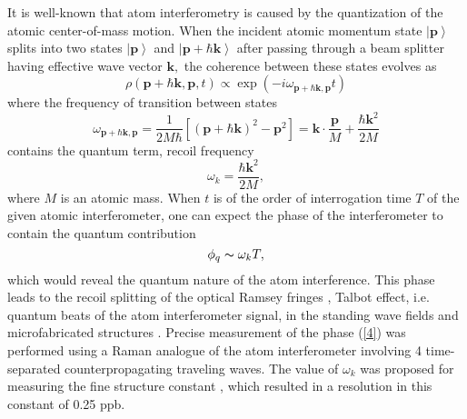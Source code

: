 \documentclass[twocolumn,showpacs,preprintnumbers]{revtex4}
\begin{document}
It is well-known that atom interferometry \cite{c1} is caused by the
quantization of the atomic center-of-mass motion. When the incident atomic
momentum state $\left\vert \mathbf{p}\right\rangle $ splits into two states $%
\left\vert \mathbf{p}\right\rangle $ and $\left\vert \mathbf{p}+\hbar 
\mathbf{k}\right\rangle $ after passing through a beam splitter having
effective wave vector $\mathbf{k},$ the coherence between these states
evolves as 
\begin{equation}
\rho \left( \mathbf{p}+\hbar \mathbf{k},\mathbf{p},t\right) \propto \exp
\left( -i\omega _{\mathbf{p}+\hbar \mathbf{k},\mathbf{p}}t\right)  \label{1}
\end{equation}%
where the frequency of transition between states%
\begin{equation}
\omega _{\mathbf{p}+\hbar \mathbf{k},\mathbf{p}}=\dfrac{1}{2M\hbar }\left[
\left( \mathbf{p}+\hbar \mathbf{k}\right) ^{2}-\mathbf{p}^{2}\right] =%
\mathbf{k}\cdot \dfrac{\mathbf{p}}{M}+\dfrac{\hbar \mathbf{k}^{2}}{2M}
\label{2}
\end{equation}%
contains the quantum term, recoil frequency%
\begin{equation}
\omega _{k}=\dfrac{\hbar \mathbf{k}^{2}}{2M},  \label{3}
\end{equation}%
where $M$ is an atomic mass. When $t$ is of the order of interrogation time $%
T$ of the given atomic interferometer, one can expect the phase of the
interferometer to contain the quantum contribution 
\begin{equation}
\phi _{q}\thicksim \omega _{k}T,  \label{4}
\end{equation}%
which would reveal the quantum nature of the atom interference. This phase
leads to the recoil splitting of the optical Ramsey fringes \cite{c16},
Talbot effect, i.e. quantum beats of the atom interferometer signal, in the
standing wave fields \cite{c1,c17,c20} and microfabricated structures \cite%
{c18}. Precise measurement of the phase (\ref{4}) was performed \cite{c9}
using a Raman analogue of the atom interferometer \cite{c19} involving 4
time-separated counterpropagating traveling waves. The value of $\omega _{k}$
was proposed for measuring the fine structure constant \cite{c9}, which
resulted \cite{c14} in a resolution in this constant of 0.25 ppb.
\end{document}
